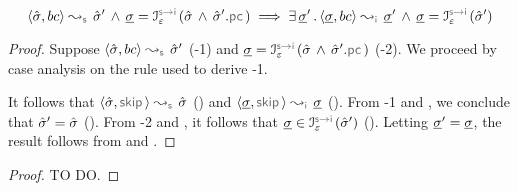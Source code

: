 \begin{lemma}
$$
\absbsemrule{\sstate, \bcmd}{\sstate'}{\symbolic} \, \wedge \, \istate = \interpret{\symbinst}{\senv}(\sstate \, \wedge \, \sstate'.\pcsel)
     \implies 
        \exists \, \istate' \, . \, \absbsemrule{\istate, \bcmd}{\istate'}{\instrumented} \, \wedge \, 
            \istate = \interpret{\symbinst}{\senv}(\sstate')
$$
\end{lemma}
\begin{proof}
Suppose $\absbsemrule{\sstate, \bcmd}{\sstate'}{\symbolic}$ (\hyp{1}) and 
$\istate = \interpret{\symbinst}{\senv}(\sstate \, \wedge \, \sstate'.\pcsel)$ (\hyp{2}).
We proceed by case analysis on the rule used to derive \hyp{1}. 
\vspace{3pt}


\noindent {} It follows that $\absbsemrule{\sstate, \jsilskip}{\sstate}{\symbolic}$ () and 
$\absbsemrule{\istate, \jsilskip}{\istate}{\instrumented}$ (). 
From \hyp{1} and , we conclude that $\hat{\sigma}' = \hat{\sigma}$ (). 
From \hyp{2} and , it follows that $\istate \in \interpret{\symbinst}{\senv}(\sstate')$ (). 
Letting $\underline{\sigma}' = \underline{\sigma}$, the result follows from  and . 
\vspace{5pt}

\end{proof}

%


\begin{temax}

\end{temax}
\begin{proof}
TO DO. 
\end{proof}



